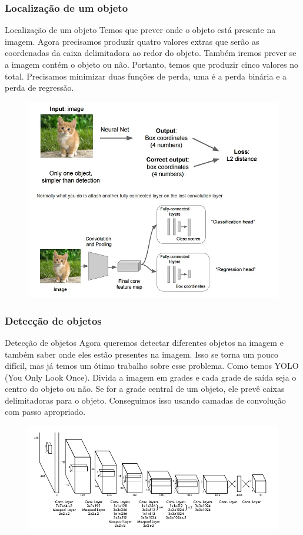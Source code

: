 \documentclass{beamer}
\begin{document}
\begin{frame}
	\frametitle{Localização de um objeto}
	\begin{block}{Localização de um objeto}
		Temos que prever onde o objeto está presente na imagem. Agora precisamos produzir quatro valores extras que serão as coordenadas da caixa delimitadora ao redor do objeto. Também iremos prever se a imagem contém o objeto ou não. Portanto, temos que produzir cinco valores no total. Precisamos minimizar duas funções de perda, uma é a perda binária e a perda de regressão.
	\end{block}
	\begin{figure}
		\centering
		\includegraphics[width=0.4\linewidth]{figures/localizing_object}
	\end{figure}
	
\end{frame}


\begin{frame}
	\frametitle{Detecção de objetos}
	\begin{block}{Detecção de objetos}
		Agora queremos detectar diferentes objetos na imagem e também saber onde eles estão presentes na imagem. Isso se torna um pouco difícil, mas já temos um ótimo trabalho sobre esse problema. Como temos YOLO (You Only Look Once).
		Divida a imagem em grades e cada grade de saída seja o centro do objeto ou não. Se for a grade central de um objeto, ele prevê caixas delimitadoras para o objeto. Conseguimos isso usando camadas de convolução com passo apropriado.
	\end{block}
		\begin{figure}
			\centering
			\includegraphics[width=0.7\linewidth]{figures/cnn_yolo}
		\end{figure}
		
	
\end{frame}
\end{document}
